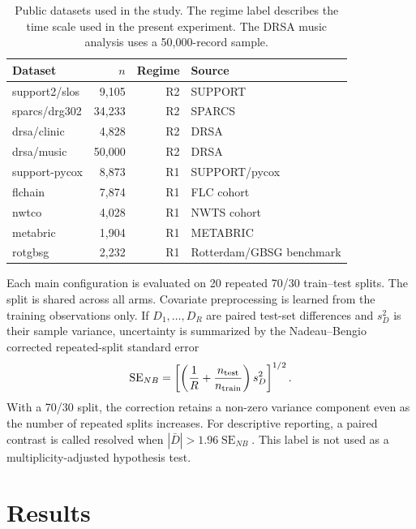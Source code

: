 \documentclass[smallextended,natbib]{svjour3}
\begin{document}
\begin{table}[!htbp]
\caption{Public datasets used in the study. The regime label describes the time scale used in the present experiment. The DRSA music analysis uses a 50,000-record sample.}
\label{tab:datasets}
\centering
\small
\begin{tabular}{@{}lrrp{}@{}}
\toprule
Dataset & $n$ & Regime & Source \\
\midrule
support2/slos & 9,105 & R2 & SUPPORT \citep{support1995,vanderbiltSupport2026} \\
sparcs/drg302 & 34,233 & R2 & SPARCS \citep{nysdoh2012sparcs} \\
drsa/clinic & 4,828 & R2 & DRSA \citep{ren2019drsa} \\
drsa/music & 50,000 & R2 & DRSA \citep{ren2019drsa} \\
support-pycox & 8,873 & R1 & SUPPORT/pycox \citep{support1995,kvamme2019pycox} \\
flchain & 7,874 & R1 & FLC cohort \citep{dispenzieri2012flchain} \\
nwtco & 4,028 & R1 & NWTS cohort \citep{breslow1999nwtco} \\
metabric & 1,904 & R1 & METABRIC \citep{curtis2012metabric} \\
rotgbsg & 2,232 & R1 & Rotterdam/GBSG benchmark \citep{foekens2000rotterdam,schumacher1994gbsg,katzman2018deepsurv} \\
\bottomrule
\end{tabular}
\end{table}
\FloatBarrier

Each main configuration is evaluated on 20 repeated 70/30 train--test splits. The split is shared across all arms. Covariate preprocessing is learned from the training observations only. If $D_1,\ldots,D_R$ are paired test-set differences and $s_D^2$ is their sample variance, uncertainty is summarized by the Nadeau--Bengio corrected repeated-split standard error \citep{nadeau2003}
\begin{equation}
\operatorname{SE}_{NB}
=
\left[\left(\frac{1}{R}+\frac{n_{\rm test}}{n_{\rm train}}\right)s_D^2\right]^{1/2}.
\label{eq:nbse}
\end{equation}
With a 70/30 split, the correction retains a non-zero variance component even as the number of repeated splits increases. For descriptive reporting, a paired contrast is called resolved when $|\bar D|>1.96\operatorname{SE}_{NB}$. This label is not used as a multiplicity-adjusted hypothesis test.

\section{Results}
\label{sec:results}
\end{document}
